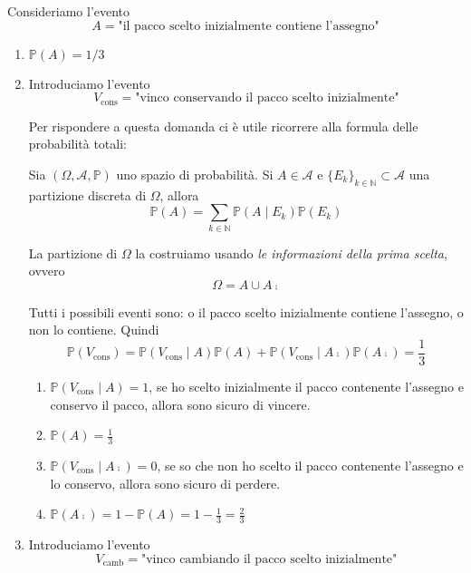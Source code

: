 Consideriamo l'evento
\begin{equation*}
A=\text{"il pacco scelto inizialmente contiene l'assegno"}
\end{equation*}
\begin{enumerate}
\item $\mathbb{P}( A) =1/3$
\item Introduciamo l'evento\begin{equation*}
V_{\text{cons}} =\text{"vinco conservando il pacco scelto inizialmente"}
\end{equation*}

Per rispondere a questa domanda ci è utile ricorrere alla formula delle probabilità totali:\begin{theorem}
Sia $( \Omega ,\mathcal{A} ,\mathbb{P})$ uno spazio di probabilità. Si $A\in \mathcal{A}$ e $\{E_{k}\}_{k\in \mathbb{N}} \subset \mathcal{A}$ una partizione discreta di $\Omega $, allora
\begin{equation*}
\mathbb{P}( A) =\sum\limits _{k\in \mathbb{N}}\mathbb{P}( A\mid E_{k})\mathbb{P}( E_{k})
\end{equation*}
\end{theorem}

La partizione di $\Omega $ la costruiamo usando \textit{le informazioni della prima scelta}, ovvero\begin{equation*}
\Omega =A\cup A\comp
\end{equation*}

Tutti i possibili eventi sono: o il pacco scelto inizialmente contiene l'assegno, o non lo contiene. Quindi\begin{equation*}
\mathbb{P}( V_{\text{cons}}) =\mathbb{P}( V_{\text{cons}} \mid A)\mathbb{P}( A) +\mathbb{P}\left( V_{\text{cons}} \mid A\comp\right)\mathbb{P}\left( A\comp\right) =\frac{1}{3}
\end{equation*}
\begin{enumerate}
\item $\mathbb{P}( V_{\text{cons}} \mid A) =1$, se ho scelto inizialmente il pacco contenente l'assegno e conservo il pacco, allora sono sicuro di vincere.
\item $\mathbb{P}( A) =\frac{1}{3}$
\item $\mathbb{P}\left( V_{\text{cons}} \mid A\comp\right) =0$, se so che non ho scelto il pacco contenente l'assegno e lo conservo, allora sono sicuro di perdere.
\item $\mathbb{P}\left( A\comp\right) =1-\mathbb{P}( A) =1-\frac{1}{3} =\frac{2}{3}$
\end{enumerate}
\item Introduciamo l'evento\begin{equation*}
V_{\text{camb}} =\text{"vinco cambiando il pacco scelto inizialmente"}
\end{equation*}


\end{enumerate}
